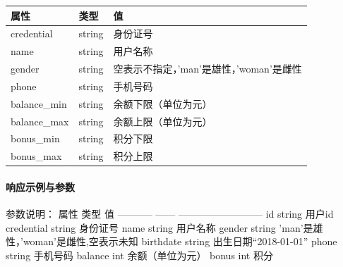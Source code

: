 \documentclass[]{article}
\let\oldparagraph\paragraph
\renewcommand{\paragraph}[1]{\oldparagraph{#1}\mbox{}}
\begin{document}
\begin{longtable}[]{@{}lll@{}}
\toprule
属性 & 类型 & 值\tabularnewline
\midrule
\endhead
credential & string & 身份证号\tabularnewline
name & string & 用户名称\tabularnewline
gender & string &
空表示不指定，'man'是雄性，'woman'是雌性\tabularnewline
phone & string & 手机号码\tabularnewline
balance\_min & string & 余额下限（单位为元）\tabularnewline
balance\_max & string & 余额上限（单位为元）\tabularnewline
bonus\_min & string & 积分下限\tabularnewline
bonus\_max & string & 积分上限\tabularnewline
\bottomrule
\end{longtable}

\hypertarget{ux54cdux5e94ux793aux4f8bux4e0eux53c2ux6570-4}{%
\paragraph{响应示例与参数}\label{ux54cdux5e94ux793aux4f8bux4e0eux53c2ux6570-4}}

\begin{Shaded}
\begin{Highlighting}[]
\FunctionTok{\{}
    \FunctionTok{:}\OtherTok{[}
        \FunctionTok{\{}
            \FunctionTok{:}\FunctionTok{,}
            \FunctionTok{:}\FunctionTok{,}
            \FunctionTok{:}\FunctionTok{,}
            \FunctionTok{:}\FunctionTok{,}
            \FunctionTok{:}\FunctionTok{,}
            \FunctionTok{:}\FunctionTok{,}
            \FunctionTok{:}\FunctionTok{,}
            \FunctionTok{:}
        \FunctionTok{\}}\OtherTok{,}
        \FunctionTok{\{}
        \FunctionTok{\}}
    \OtherTok{]}
\FunctionTok{\}}
\end{Highlighting}
\end{Shaded}

参数说明： \textbar{} 属性 \textbar{} 类型 \textbar{} 值 \textbar{}
\textbar{} ----------- \textbar{} ------ \textbar{}
-------------------------- \textbar{} \textbar{} id \textbar{} string
\textbar{} 用户id \textbar{} \textbar{} credential \textbar{} string
\textbar{} 身份证号 \textbar{} \textbar{} name \textbar{} string
\textbar{} 用户名称 \textbar{} \textbar{} gender \textbar{} string
\textbar{} 'man'是雄性，'woman'是雌性,空表示未知 \textbar{} \textbar{}
birthdate \textbar{} string \textbar{} 出生日期``2018-01-01'' \textbar{}
\textbar{} phone \textbar{} string \textbar{} 手机号码 \textbar{}
\textbar{} balance \textbar{} int \textbar{} 余额（单位为元） \textbar{}
\textbar{} bonus \textbar{} int \textbar{} 积分 \textbar{}
\end{document}

